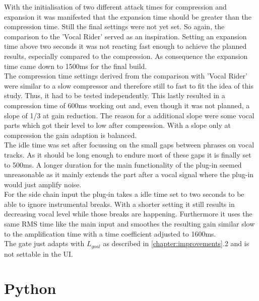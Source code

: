 With the initialisation of two different attack times for compression and expansion it was manifested that the expansion time should be greater than the compression time. Still the final settings were not yet set. So again, the comparison to the 'Vocal Rider' served as an inspiration. Setting an expansion time above two seconds it was not reacting fast enough to achieve the planned results, especially compared to the compression. As consequence the expansion time came down to 1500ms for the final build.\\
The compression time settings derived from the comparison with 'Vocal Rider' were similar to a slow compressor and therefore still to fast to fit the idea of this study. Thus, it had to be tested independently. This lastly resulted in a compression time of 600ms working out and, even though it was not planned, a slope of 1/3 at gain reduction. The reason for a additional slope were some vocal parts which got their level to low after compression. With a slope only at compression the gain adaption is balanced.\\
The idle time was set after focussing on the small gaps between phrases on vocal tracks. As it should be long enough to endure most of these gaps it is finally set to 500ms. A longer duration for the main functionality of the plug-in seemed unreasonable as it mainly extends the part after a vocal signal where the plug-in would just amplify noise.\\
For the side chain input the plug-in takes a idle time set to two seconds to be able to ignore instrumental breaks. With a shorter setting it still results in decreasing vocal level while those breaks are happening. Furthermore it uses the same RMS time like the main input and smoothes the resulting gain similar slow to the amplification time with a time coefficient adjusted to 1600ms.\\
The gate just adapts with $L_{goal}$ as described in \ref{chapter:improvements}.2 and is not settable in the UI.\\

\section{Python}

